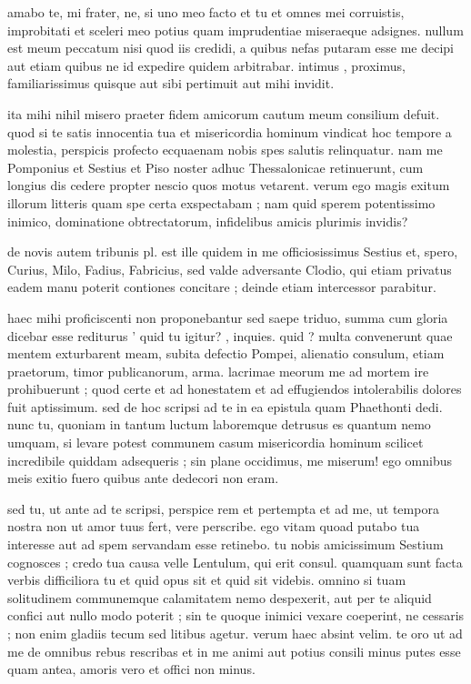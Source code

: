 


 amabo te, mi frater, ne, si uno meo facto et tu et omnes mei corruistis, improbitati et sceleri meo potius quam imprudentiae miseraeque adsignes. nullum est meum peccatum nisi quod iis credidi, a quibus nefas putaram esse me decipi aut etiam quibus ne id expedire quidem arbitrabar. intimus , proximus, familiarissimus quisque aut sibi pertimuit aut mihi invidit.

 ita mihi nihil misero praeter fidem amicorum cautum meum consilium defuit. quod si te satis innocentia tua et misericordia hominum vindicat hoc tempore a molestia, perspicis profecto ecquaenam nobis spes salutis relinquatur. nam me Pomponius et Sestius et Piso noster adhuc Thessalonicae retinuerunt, cum longius dis cedere propter nescio quos motus vetarent. verum ego magis exitum illorum litteris quam spe certa exspectabam ; nam quid sperem potentissimo inimico, dominatione obtrectatorum, infidelibus amicis plurimis invidis?

 de novis autem tribunis pl. est ille quidem in me officiosissimus Sestius et, spero, Curius, Milo, Fadius, Fabricius, sed valde adversante Clodio, qui etiam privatus eadem manu poterit contiones concitare ; deinde etiam intercessor parabitur.

 haec mihi proficiscenti non proponebantur sed saepe triduo, summa cum gloria dicebar esse rediturus ' quid tu igitur? , inquies. quid ? multa convenerunt quae mentem exturbarent meam, subita defectio Pompei, alienatio consulum, etiam praetorum, timor publicanorum, arma. lacrimae meorum me ad mortem ire prohibuerunt ; quod certe et ad honestatem et ad effugiendos intolerabilis dolores fuit aptissimum. sed de hoc scripsi ad te in ea epistula quam Phaethonti dedi. nunc tu, quoniam in tantum luctum laboremque detrusus es quantum nemo umquam, si levare potest communem casum misericordia hominum scilicet incredibile quiddam adsequeris ; sin plane occidimus, me miserum! ego omnibus meis exitio fuero quibus ante dedecori non eram.

 sed tu, ut ante ad te scripsi, perspice rem et pertempta et ad me, ut tempora nostra non ut amor tuus fert, vere perscribe. ego vitam quoad putabo tua interesse aut ad spem servandam esse retinebo. tu nobis amicissimum Sestium cognosces ; credo tua causa velle Lentulum, qui erit consul. quamquam sunt facta verbis difficiliora tu et quid opus sit et quid sit videbis. omnino si tuam solitudinem communemque calamitatem nemo despexerit, aut per te aliquid confici aut nullo modo poterit ; sin te quoque inimici vexare coeperint, ne cessaris ; non enim gladiis tecum sed litibus agetur. verum haec absint velim. te oro ut ad me de omnibus rebus rescribas et in me animi aut potius consili minus putes esse quam antea, amoris vero et offici non minus.
